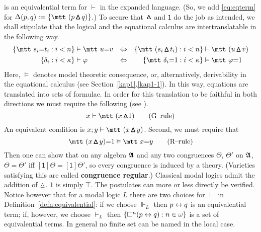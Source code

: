 is an equivalential term for $\vdash$ in the expanded language. 
(So, we add \eqref{eq:eqterm} for $\Delta(p,q) := 
\{\mbox{\mtt ($p\!\boldsymbol{\triangleup}\!q$)}\}$.)
To secure that $\boldsymbol{\vartriangle}$ and $\mathsf{1}$ do the job 
as intended, we shall stipulate that the logical and the equational 
calculus are intertranslatable in the following way.
\begin{align}
\{\mbox{\mtt $s_i$=$t_i$} : i < n\} & \vDash \mbox{\mtt $u$=$v$}
    & \Dpf &&
\{\mbox{\mtt ($s_i\!\boldsymbol{\triangleup}\!t_i$)} : 
i < n\} & \vdash \mbox{\mtt ($u\!\boldsymbol{\triangleup}\!v$)} \\
\{\delta_i : i < \kappa\} & \vdash \varphi & \Dpf &&
    \{\mbox{\mtt $\delta_i$=1} :
    i < \kappa\} & \vDash \mbox{\mtt $\varphi$=1}
\end{align}
Here, $\vDash$ denotes model theoretic consequence, or,
alternatively, derivability in the equational calculus
(see Section~\ref{kap1}.\ref{kap1-1}). In this way, equations are
translated into sets of formulae. In order for this 
translation to be faithful in both directions we must
require the following (see \cite{pigozzi:fregean}).
\begin{equation}
x \vdash \mbox{\mtt ($x\!\boldsymbol{\triangleup}$1)}\qquad
\mbox{\rm (G--rule)}
\end{equation}
An equivalent condition is $x; y \vdash 
\mbox{\mtt ($x\!\boldsymbol{\triangleup}\!y$)}$. 
Second, we must require that
\begin{equation}
\mbox{\mtt ($x\!\boldsymbol{\triangleup}\!y$)=1}
\vDash \mbox{\mtt $x$=$y$}\qquad \mbox{\rm (R--rule)}
\end{equation}
Then one can show that on any algebra $\mathfrak{A}$ and any two congruences
$\Theta$, $\Theta'$ on $\mathfrak{A}$, $\Theta = \Theta'$ iff
$[\mathsf{1}]\Theta = [\mathsf{1}]\Theta'$,
so every congruence is induced by a theory. (Varieties satisfying 
this are called \textbf{congruence regular}.) 
Classical modal
logics admit the addition of $\vartriangle$. $\mathsf{1}$ is simply
$\top$. The postulates can more or less directly be verified.
Notice however that for a modal logic $L$ there are two
choices for $\vdash$ in Definition~\ref{defn:equivalential}:
if we choose $\Vdash_{L}$ then $p \leftrightarrow q$ is an
equivalential term; if, however, we choose $\vdash_{L}$
then $\{\square^n (p \leftrightarrow q) : n \in \omega\}$ is a set of
equivalential terms. In general no finite set can be
named in the local case.

